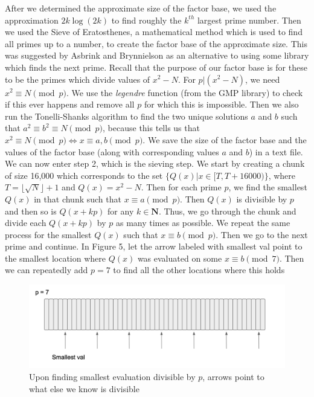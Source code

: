 \documentclass[11pt,twocolumn]{article}
\begin{document}
\indent After we determined the approximate size of the factor base, we used the approximation $2k \log(2k)$ \cite{archer:qsgpu} to find roughly the $k^{th}$ largest prime number. Then we used the Sieve of Eratosthenes, a mathematical method which is used to find all primes up to a number, to create the factor base of the approximate size. This was suggested by Asbrink and Brynnielson \cite{asbrink:parallelqs} as an alternative to using some library which finds the next prime. Recall that the purpose of our factor base is for these to be the primes which divide values of $x^2 - N$. For $p | (x^2 - N)$, we need $x^2 \equiv N \pmod{p}$. We use the \textit{legendre} function (from the GMP library) to check if this ever happens and remove all $p$ for which this is impossible. Then we also run the Tonelli-Shanks algorithm to find the two unique solutions $a$ and $b$ such that $a^2 \equiv b^2 \equiv N \pmod{p}$, because this tells us that $x^2 \equiv N \pmod{p} \iff x \equiv a, b \pmod{p}$. We save the size of the factor base and the values of the factor base (along with corresponding values $a$ and $b$) in a text file.
\indent We can now enter step 2, which is the sieving step. We start by creating a chunk of size 16,000 which corresponds to the set $\{Q(x) | x \in [T, T + 16000) \}$, where $T = \lfloor \sqrt{N} \rfloor + 1$ and $Q(x) = x^2 - N$. Then for each prime $p$, we find the smallest $Q(x)$ in that chunk such that $x \equiv a \pmod{p}$. Then $Q(x)$ is divisible by $p$ and then so is $Q(x + kp)$ for any $k \in \mathbf{N}$. Thus, we go through the chunk and divide each $Q(x + kp)$ by $p$ as many times as possible. We repeat the same process for the smallest $Q(x)$ such that $x \equiv b \pmod{p}$. Then we go to the next prime and continue. In Figure 5, let the arrow labeled with smallest val point to the smallest location where $Q(x)$ was evaluated on some $x \equiv b \pmod{7}$. Then we can repeatedly add $p = 7$ to find all the other locations where this holds

\begin{figure}[!htb]
    \centering
   \includegraphics[scale = 0.2]{Tonnelli.png}
    \caption{Upon finding smallest evaluation divisible by $p$, arrows point to what else we know is divisible}
    \label{Tonnelli}
\end{figure}
\end{document}
